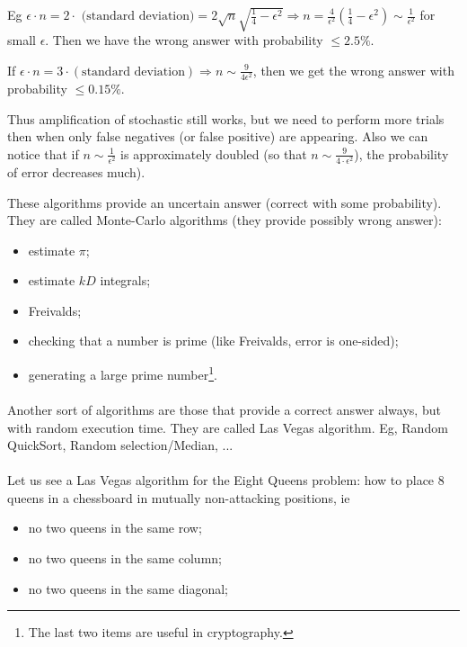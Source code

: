 \begin{itemize}
	Eg $\epsilon \cdot n=2\cdot \text{ (standard deviation)}=2\sqrt{n}\sqrt{\frac{1}{4}-\epsilon^2} \Rightarrow n=\frac{4}{\epsilon^2}\left(\frac{1}{4}-\epsilon^2\right)\sim \frac{1}{\epsilon^2}$ for small $\epsilon$. Then we have the wrong answer with probability $\leq 2.5\%$.
	
	If $\epsilon\cdot n=3\cdot (\text{standard deviation})\Rightarrow n\sim \frac{9}{4\epsilon^2}$, then we get the wrong answer with probability $\leq 0.15\%$.
	
	Thus amplification of stochastic still works, but we need to perform more trials then when only false negatives (or false positive) are appearing. Also we can notice that if $n\sim \frac{1}{\epsilon^2}$ is approximately doubled (so that $n\sim \frac{9}{4\cdot \epsilon^2}$), the probability of error decreases much).
	\end{itemize}
	
	These algorithms provide an uncertain answer (correct with some probability). They are called Monte-Carlo algorithms (they provide possibly wrong answer):
	\begin{itemize}
		\item estimate $\pi$;
		\item estimate $kD$ integrals;
		\item Freivalds;
		\item checking that a number is prime (like Freivalds, error is one-sided);
		\item generating a large prime number\footnote{The last two items are useful in cryptography.}.
	\end{itemize}
\paragraph{}

Another sort of algorithms are those that provide a correct answer always, but with random execution time. They are called Las Vegas algorithm. Eg, Random QuickSort, Random selection/Median, ...

\paragraph{}

Let us see a Las Vegas algorithm for the Eight Queens problem: how to place 8 queens in a chessboard in mutually non-attacking positions, ie
\begin{itemize}
	\item no two queens in the same row;
	\item no two queens in the same column;
	\item no two queens in the same diagonal;
\end{itemize}

